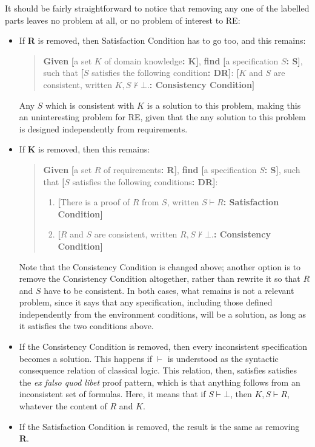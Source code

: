 \documentclass[graybox]{svmult}
\newcommand{\zi}[1]{\textit{#1}}
\newcommand{\xb}[1]{\textbf{#1}}
\newcommand{\RE}{RE}
\newcommand{\SatisfactionCondition}{Satisfaction Condition}
\newcommand{\ConsistencyCondition}{Consistency Condition}
\newcommand{\CLabel}[2]{\xb{[}#1\xb{: #2]}}
\begin{document}
It should be fairly straightforward to notice that removing any one of the labelled parts leaves no problem at all, or no problem of interest to \RE:
\begin{itemize}
    \item{If \xb{R} is removed, then \SatisfactionCondition{} has to go too, and this remains:
        \begin{quote}
            \xb{Given} \CLabel{a set $K$ of domain knowledge}{K}, \xb{find} \CLabel{a specification $S$}{S}, such that \CLabel{$S$ satisfies the following condition}{DR}: \CLabel{$K$ and $S$ are consistent, written $K, S \not\vdash \bot$.}{\ConsistencyCondition}
        \end{quote}
    Any $S$ which is consistent with $K$ is a solution to this problem, making this an uninteresting problem for \RE{}, given that the any solution to this problem is designed independently from requirements.}
    \item{If \xb{K} is removed, then this remains:
        \begin{quote}
            \xb{Given} \CLabel{a set $R$ of requirements}{R}, \xb{find} \CLabel{a specification $S$}{S}, such that \CLabel{$S$ satisfies the following conditions}{DR}:
\begin{enumerate}
    \item{\CLabel{There is a proof of $R$ from $S$, written $S \vdash R$}{\SatisfactionCondition}}
    \item{\CLabel{$R$ and $S$ are consistent, written $R, S \not\vdash \bot$.}{\ConsistencyCondition}}
\end{enumerate}
        \end{quote}
    Note that the \ConsistencyCondition{} is changed above; another option is to remove the \ConsistencyCondition{} altogether, rather than rewrite it so that $R$ and $S$ have to be consistent. In both cases, what remains is not a relevant problem, since it says that any specification, including those defined independently from the environment conditions, will be a solution, as long as it satisfies the two conditions above.}
    \item{If the \ConsistencyCondition{} is removed, then every inconsistent specification becomes a solution. This happens if $\vdash$ is understood as the syntactic consequence relation of classical logic. This relation, then, satisfies satisfies the \zi{ex falso quod libet} proof pattern, which is that anything follows from an inconsistent set of formulas. Here, it means that if $S \vdash \bot$, then $K, S \vdash R$, whatever the content of $R$ and $K$.}
    \item{If the \SatisfactionCondition{} is removed, the result is the same as removing \xb{R}.}
\end{itemize}
\end{document}
